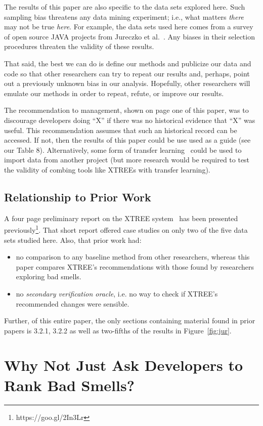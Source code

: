 \documentclass[twocolumn,5p]{elsarticle}
\newcommand{\bi}{\begin{itemize}[leftmargin=0.4cm]}
\newcommand{\ei}{\end{itemize}}
\newcommand{\fig}[1]{Figure~\ref{fig:#1}}
\theoremstyle{break}
\begin{document}
The results of this paper are also specific to the data sets explored here.
Such sampling bias threatens any data mining experiment; i.e., what matters
{\em there} may not be true {\em here}. For example, the data sets used here comes from a survey of
open source JAVA projects from Jureczko et al.~\cite{jureczko10}. Any biases in their selection procedures
threaten the validity of these results. 

That said,
the best we can do is define our methods and publicize our data and code so that other researchers can
try to repeat our results and, perhaps, point out a previously unknown bias
in our analysis. Hopefully, other researchers will emulate our methods in
order to repeat, refute, or improve our results. 

The recommendation to management, shown on page one of this paper,  was to discourage developers doing ``X'' if there was no historical evidence that ``X'' was useful. 
This recommendation assumes that such an  historical record can be accessed. If not,  then the results of this paper could be use used as a guide (see our Table 8). Alternatively, some form of transfer learning~\cite{Nam15,Jing15,krishna16} could be used to import data from another project (but more research would be required to test the validity of combing tools like XTREEs with transfer learning). 
  

  
  
  \subsection{Relationship to Prior Work }
A four page preliminary report on the XTREE system~\cite{krishna2015actionable} has been presented previously\footnote{https://goo.gl/2In3Lr}. That short report offered case studies on only two  of
the five data sets studied here. Also, that prior work had:
\bi
\item
no comparison to any baseline
method from other researchers, whereas this paper compares XTREE's recommendations
with those found by researchers exploring bad smells.
\item
no {\em secondary verification oracle}, i.e. no way to check if XTREE's recommended changes were sensible.
\ei
Further, of this entire paper, the only sections containing material
found in prior papers is 3.2.1, 3.2.2 as well as two-fifths of the results in \fig{jur}. 



\section{Why Not Just Ask Developers to Rank Bad Smells?}\label{sect:prelim}
\end{document}
